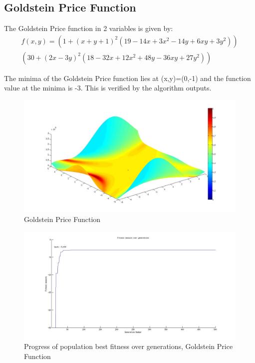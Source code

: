 \documentclass[ExampleMasters.tex]{subfiles}
\begin{document}
		\subsection{Goldstein Price Function}

			The Goldstein Price function in 2 variables is given by:
			\begin{multline}
				f(x,y)=(1+(x+y+1)^2(19-14x+3x^2-14y+6xy+3y^2))\\
					(30+(2x-3y)^2(18-32x+12x^2+48y-36xy+27y^2))
			\end{multline}

			The minima of the Goldstein Price function lies at (x,y)=(0,-1) and the function value at the minima is -3. This is verified by the algorithm outputs.

			\begin{figure}[hb!]
				\centering
				\includegraphics[width=\textwidth]{figures/GeneticAlgorithm/GPR.jpg}
				\caption{Goldstein Price Function}
				\label{GPR}
			\end{figure}

			\begin{figure}[hb!]
				\centering
				\includegraphics[width=\textwidth]{figures/GeneticAlgorithm/GPR_fitness_vs_generation.jpg}
				\caption{Progress of population best fitness over generations, Goldstein Price Function}
				\label{GPRF}
			\end{figure}
\end{document}
